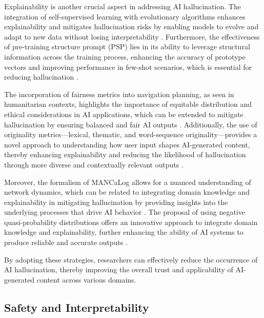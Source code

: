 Explainability is another crucial aspect in addressing AI hallucination. The integration of self-supervised learning with evolutionary algorithms enhances explainability and mitigates hallucination risks by enabling models to evolve and adapt to new data without losing interpretability \cite{le2019evolvingselfsupervisedneuralnetworks}. Furthermore, the effectiveness of pre-training structure prompt (PSP) lies in its ability to leverage structural information across the training process, enhancing the accuracy of prototype vectors and improving performance in few-shot scenarios, which is essential for reducing hallucination \cite{ge2024psppretrainingstructureprompt}.

The incorporation of fairness metrics into navigation planning, as seen in humanitarian contexts, highlights the importance of equitable distribution and ethical considerations in AI applications, which can be extended to mitigate hallucination by ensuring balanced and fair AI outputs \cite{brandao2020fairnavigationplanninghumanitarian}. Additionally, the use of originality metrics—lexical, thematic, and word-sequence originality—provides a novel approach to understanding how user input shapes AI-generated content, thereby enhancing explainability and reducing the likelihood of hallucination through more diverse and contextually relevant outputs \cite{palmini2024patternscreativityuserinput}.

Moreover, the formalism of MANCaLog allows for a nuanced understanding of network dynamics, which can be related to integrating domain knowledge and explainability in mitigating hallucination by providing insights into the underlying processes that drive AI behavior \cite{shakarian2022reasoningcomplexnetworkslogic}. The proposal of using negative quasi-probability distributions offers an innovative approach to integrate domain knowledge and explainability, further enhancing the ability of AI systems to produce reliable and accurate outputs \cite{debarros2015examplescontextualityphysicsimplications}.

By adopting these strategies, researchers can effectively reduce the occurrence of AI hallucination, thereby improving the overall trust and applicability of AI-generated content across various domains.



\subsection{Safety and Interpretability} \label{subsec:Safety and Interpretability}

